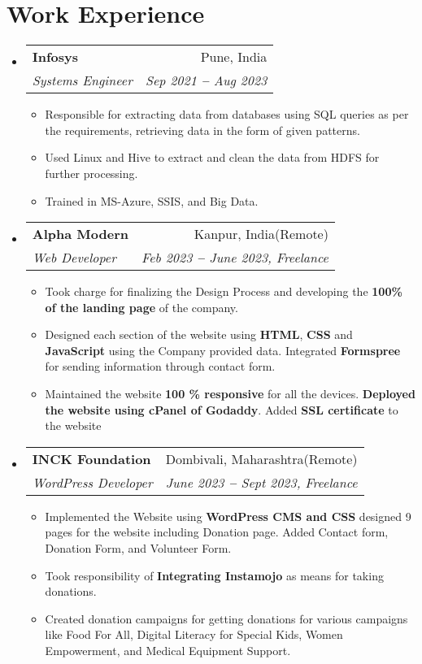 \documentclass[letterpaper,11pt]{article}
\makeatletter
\newcommand{\resumeItem}[1]{
  \item\small{
    {#1 \vspace{-2pt}}
  }
}
\newcommand{\resumeSubheading}[4]{
  \vspace{-2pt}\item
    \begin{tabular*}{0.97\textwidth}[t]{l@{\extracolsep{\fill}}r}
      \textbf{#1} & #2 \\
      \textit{\small#3} & \textit{\small #4} \\
    \end{tabular*}\vspace{-7pt}
}
\newcommand{\resumeSubHeadingListStart}{\begin{itemize}[leftmargin=0.15in, label={}]}
\newcommand{\resumeSubHeadingListEnd}{\end{itemize}}
\newcommand{\resumeItemListStart}{\begin{itemize}}
\newcommand{\resumeItemListEnd}{\end{itemize}\vspace{-5pt}}
\makeatother
\begin{document}

\section{Work Experience}
  \vspace{3pt}
  \resumeSubHeadingListStart

    \resumeSubheading
      {Infosys}{Pune, India}
      {Systems Engineer}{Sep 2021 \textbf{--} Aug 2023}
        \resumeItemListStart
            \resumeItem{Responsible for extracting data from databases using SQL queries as per the requirements, retrieving data in the form of given patterns. }
            \resumeItem{Used Linux and Hive to extract and clean the data from HDFS for further processing.}
            \resumeItem{Trained in MS-Azure, SSIS, and Big Data.}
        \resumeItemListEnd

    \resumeSubheading
      {Alpha Modern}{Kanpur, India(Remote)}
      {Web Developer}{Feb 2023 \textbf{--} June 2023, Freelance}
        \resumeItemListStart
            \resumeItem{Took charge for finalizing the Design Process and developing the \textbf{100\% of the landing page} of the company.}
            \resumeItem{Designed each section of the website using \textbf{HTML}, \textbf{CSS} and \textbf{JavaScript} using the Company provided data. Integrated \textbf{Formspree} for sending information through contact form.}
            \resumeItem{Maintained the website \textbf{100 \% responsive} for all the devices. \textbf{Deployed the website using cPanel of Godaddy}. Added \textbf{SSL certificate} to the website }
        \resumeItemListEnd
    
    \resumeSubheading
      {INCK Foundation}{Dombivali, Maharashtra(Remote)}
      {WordPress Developer}{June 2023 \textbf{--} Sept 2023, Freelance}
        \resumeItemListStart
            \resumeItem{Implemented the Website using \textbf{WordPress CMS and CSS}} designed 9 pages for the website including Donation page. Added Contact form, Donation Form, and Volunteer Form.
            \resumeItem{Took responsibility of \textbf{Integrating Instamojo} as means for taking donations.}
            \resumeItem{Created donation campaigns for getting donations for various campaigns like Food For All, Digital Literacy for Special Kids, Women Empowerment, and Medical Equipment Support.}
            
        \resumeItemListEnd
    
  \resumeSubHeadingListEnd
\end{document}
